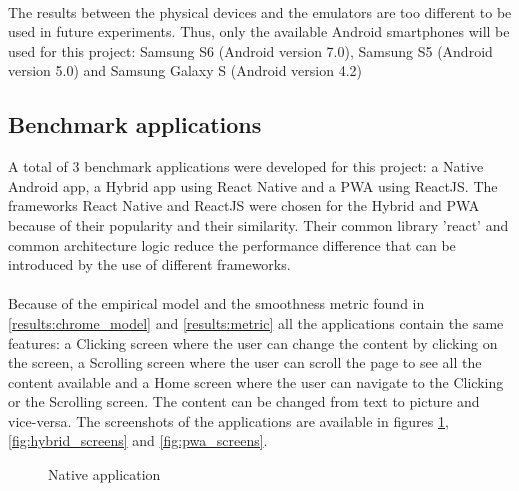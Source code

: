 \paragraph{}
The results between the physical devices and the emulators are too different to be used in future experiments. Thus, only the available Android smartphones will be used for this project: Samsung S6 (Android version 7.0), Samsung S5 (Android version 5.0) and Samsung Galaxy S (Android version 4.2)


\subsection{Benchmark applications}

A total of 3 benchmark applications were developed for this project: a Native Android app, a Hybrid app using React Native and a PWA using ReactJS. The frameworks React Native and ReactJS were chosen for the Hybrid and PWA because of their popularity and their similarity. Their common library 'react' and common architecture logic reduce the performance difference that can be introduced by the use of different frameworks.

\paragraph{}
Because of the empirical model and the smoothness metric found in \autoref{results:chrome_model} and \autoref{results:metric} all the applications contain the same features: a Clicking screen where the user can change the content by clicking on the screen, a Scrolling screen where the user can scroll the page to see all the content available and a Home screen where the user can navigate to the Clicking or the Scrolling screen. The content can be changed from text to picture and vice-versa. The screenshots of the applications are available in figures \ref{fig:native_screens}, \ref{fig:hybrid_screens} and \ref{fig:pwa_screens}.

\begin{figure}
    \centering
    \hfill
    \hfill
    \hfill
    \hfill
    \caption{Native application}
    \label{fig:native_screens}
\end{figure}

